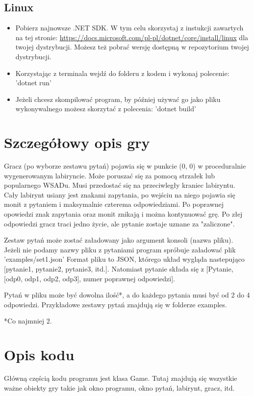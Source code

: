 \documentclass[a4paper]{article}
\begin{document}
\subsection{Linux}
\begin{itemize}
    \item Pobierz najnowsze .NET SDK. W tym celu skorzystaj z instukcji zawartych na tej stronie: \url{https://docs.microsoft.com/pl-pl/dotnet/core/install/linux} dla twojej dystrybucji. Możesz też pobrać wersję dostępną w repozytorium twojej dystrybucji.
    \item Korzystając z terminala wejdź do folderu z kodem i wykonaj polecenie: 'dotnet run'
    \item Jeżeli chcesz skompilować program, by później używać go jako pliku wykonywalnego możesz skorzytać z polecenia: 'dotnet build'
\end{itemize}

\section{Szczegółowy opis gry}

Gracz (po wyborze zestawu pytań) pojawia się w punkcie (0, 0) w proceduralnie wygenerowanym labiryncie. Może poruszać się za pomocą strzałek lub popularnego WSADu. Musi przedostać się na przeciwległy kraniec labiryntu. Cały labirynt usiany jest znakami zapytania, po wejściu na niego pojawia się monit z pytaniem i maksymalnie czterema odpowiedziami. Po poprawnej opowiedzi znak zapytania oraz monit znikają i można kontynuować grę. Po złej odpowiedzi gracz traci jedno życie, ale pytanie zostaje uznane za "zaliczone".

Zestaw pytań może zostać załadowany jako argument konsoli (nazwa pliku). Jeżeli nie podamy nazwy pliku z pytaniami program spróbuje załadować plik 'examples/set1.json' Format pliku to JSON, którego układ wygląda nastepująco [pytanie1, pytanie2, pytanie3, itd.]. Natomiast pytanie składa się z [Pytanie, [odp0, odp1, odp2, odp3], numer poprawnej odpowiedzi].

Pytań w pliku może być dowolna ilość*, a do każdego pytania musi być od 2 do 4 odpowiedzi. Przykładowe zestawy pytań znajdują się w folderze examples.

*Co najmniej 2.

\section{Opis kodu}

Główną częścią kodu programu jest klasa Game. Tutaj znajdują się wszystkie ważne obiekty gry takie jak okno programu, okno pytań, labirynt, gracz, itd.
\end{document}
